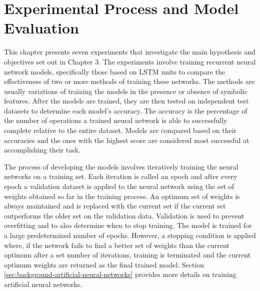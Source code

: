 \section{Experimental Process and Model Evaluation} \label{sec:empirical-studies-model-evaluation}

This chapter presents seven experiments that investigate the main hypothesis and objectives set out in Chapter 3. The experiments involve training recurrent neural network models, specifically those based on LSTM units to compare the effectiveness of two or more methods of training these networks. The methods are usually variations of training the models in the presence or absence of symbolic features. After the models are trained, they are then tested on independent test datasets to determine each model's accuracy. The accuracy is the percentage of the number of operations a trained neural network is able to successfully complete relative to the entire dataset. Models are compared based on their accuracies and the ones with the highest score are considered most successful at accomplishing their task.

The process of developing the models involves iteratively training the neural networks on a training set. Each iteration is called an epoch and after every epoch a validation dataset is applied to the neural network using the set of weights obtained so far in the training process. An optimum set of weights is always maintained and is replaced with the current set if the current set outperforms the older set on the validation data. Validation is used to prevent overfitting and to also determine when to stop training. The model is trained for a large predetermined number of epochs. However, a stopping condition is applied where, if the network fails to find a better set of weights than the current optimum after a set number of iterations, training is terminated and the current optimum weights are returned as the final trained model. Section \ref{sec:background-artificial-neural-networks} provides more details on training artificial neural networks.


